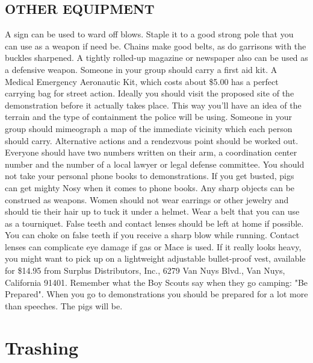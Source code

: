 \documentclass[11pt,twoside,a4paper]{book}
\begin{document}
\subsection{OTHER EQUIPMENT}

A sign can be used to ward off blows. Staple it to a good strong pole that you can use as a weapon if need be. Chains make good belts, as do garrisons with the buckles sharpened. A tightly rolled-up magazine or newspaper also can be used as a defensive weapon. Someone in your group should carry a first aid kit. A Medical Emergency Aeronautic Kit, which costs about \$5.00 has a perfect carrying bag for street action. Ideally you should visit the proposed site of the demonstration before it actually takes place. This way you'll have an idea of the terrain and the type of containment the police will be using. Someone in your group should mimeograph a map of the immediate vicinity which each person should carry. Alternative actions and a rendezvous point should be worked out. Everyone should have two numbers written on their arm, a coordination center number and the number of a local lawyer or legal defense committee. You should not take your personal phone books to demonstrations. If you get busted, pigs can get mighty Nosy when it comes to phone books. Any sharp objects can be construed as weapons. Women should not wear earrings or other jewelry and should tie their hair up to tuck it under a helmet. Wear a belt that you can use as a tourniquet. False teeth and contact lenses should be left at home if possible. You can choke on false teeth if you receive a sharp blow while running. Contact lenses can complicate eye damage if gas or Mace is used. If it really looks heavy, you might want to pick up on a lightweight adjustable bullet-proof vest, available for \$14.95 from Surplus Distributors, Inc., 6279 Van Nuys Blvd., Van Nuys, California 91401. Remember what the Boy Scouts say when they go camping: "Be Prepared". When you go to demonstrations you should be prepared for a lot more than speeches. The pigs will be. 

\section{Trashing}
\end{document}

